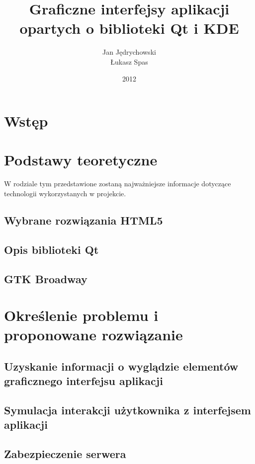 \documentclass[polish]{inz}
\title{Graficzne interfejsy aplikacji opartych o biblioteki Qt i KDE}
\author{Jan Jędrychowski\\Łukasz Spas}
\date{2012}
\begin{document}
\maketitle

\chapter{Wstęp}


\chapter{Podstawy teoretyczne}
W rodziale tym przedstawione zostaną najważniejsze informacje dotyczące technologii wykorzystanych w projekcie. 

\section{Wybrane rozwiązania HTML5}


\section{Opis biblioteki Qt}


\section{GTK Broadway}


\chapter{Określenie problemu i proponowane rozwiązanie}



\section{Uzyskanie informacji o wyglądzie elementów graficznego interfejsu aplikacji}


\section{Symulacja interakcji użytkownika z interfejsem aplikacji}


\section{Zabezpieczenie serwera}

\end{document}
